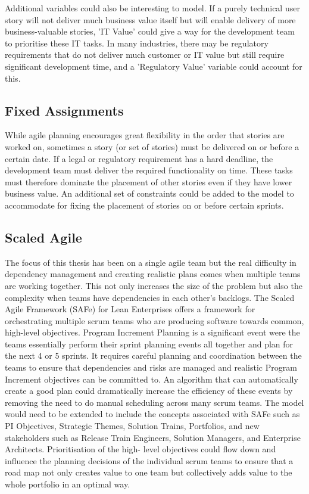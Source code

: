 Additional variables could also be interesting to model. If a purely technical user story will not deliver much business value itself but will enable delivery of more business-valuable stories, 'IT Value' could give a way for the development team to prioritise these IT tasks. In many industries, there may be regulatory requirements that do not deliver much customer or IT value but still require significant development time, and a 'Regulatory Value' variable could account for this.

\subsection{Fixed Assignments}
While agile planning encourages great flexibility in the order that stories are worked on, sometimes a story (or set of stories) must be delivered on or before a certain date. If a legal or regulatory requirement has a hard deadline, the development team must deliver the required functionality on time. These tasks must therefore dominate the placement of other stories even if they have lower business value. An additional set of constraints could be added to the model to accommodate for fixing the placement of stories on or before certain sprints.

\subsection{Scaled Agile}
The focus of this thesis has been on a single agile team but the real difficulty in dependency management and creating realistic plans comes when multiple teams are working together. This not only increases the size of the problem but also the complexity when teams have dependencies in each other's backlogs. The Scaled Agile Framework (SAFe) for Lean Enterprises \citep{scaled_agile_inc_2018} offers a framework for orchestrating multiple scrum teams who are producing software towards common, high-level objectives. Program Increment Planning is a significant event were the teams essentially perform their sprint planning events all together and plan for the next 4 or 5 sprints. It requires careful planning and coordination between the teams to ensure that dependencies and risks are managed and realistic Program Increment objectives can be committed to. An algorithm that can automatically create a good plan could dramatically increase the efficiency of these events by removing the need to do manual scheduling across many scrum teams. The model would need to be extended to include the concepts associated with SAFe such as PI Objectives, Strategic Themes, Solution Trains, Portfolios, and new stakeholders such as Release Train Engineers, Solution Managers, and Enterprise Architects. Prioritisation of the high- level objectives could flow down and influence the planning decisions of the individual scrum teams to ensure that a road map not only creates value to one team but collectively adds value to the whole portfolio in an optimal way.

